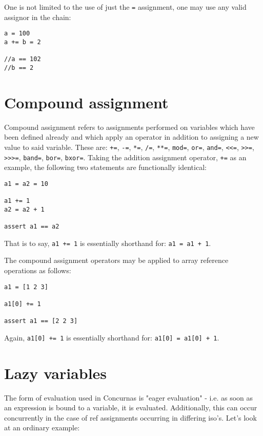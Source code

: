 \documentclass[conc-doc]{subfiles}
\begin{document}
One is not limited to the use of just the \lstinline{=} assignment, one may use any valid assignor in the chain:
\begin{lstlisting}
a = 100
a += b = 2

//a == 102
//b == 2
\end{lstlisting}

\section{Compound assignment}
Compound assignment refers to assignments performed on variables which have been defined already and which apply an operator in addition to assigning a new value to said variable. These are: \lstinline{+=}, \lstinline{-=}, \lstinline{*=}, \lstinline{/=}, \lstinline{**=}, \lstinline{mod=}, \lstinline{or=}, \lstinline{and=}, \lstinline{<<=}, \lstinline{>>=}, \lstinline{>>>=}, \lstinline{band=}, \lstinline{bor=}, \lstinline{bxor=}. Taking the addition assignment operator, \lstinline{+=} as an example, the following two statements are functionally identical:

\begin{lstlisting}
a1 = a2 = 10

a1 += 1
a2 = a2 + 1

assert a1 == a2
\end{lstlisting}

That is to say, \lstinline{a1 += 1} is essentially shorthand for: \lstinline{a1 = a1 + 1}.

The compound assignment operators may be applied to array reference operations as follows:

\begin{lstlisting}
a1 = [1 2 3]

a1[0] += 1

assert a1 == [2 2 3]
\end{lstlisting}

Again, \lstinline{a1[0] += 1} is essentially shorthand for: \lstinline{a1[0] = a1[0] + 1}.

\section{Lazy variables}
The form of evaluation used in Concurnas is "eager evaluation" - i.e. as soon as an expression is bound to a variable, it is evaluated. Additionally, this can occur concurrently in the case of ref assignments occurring in differing iso’s. Let’s look at an ordinary example:
\end{document}
